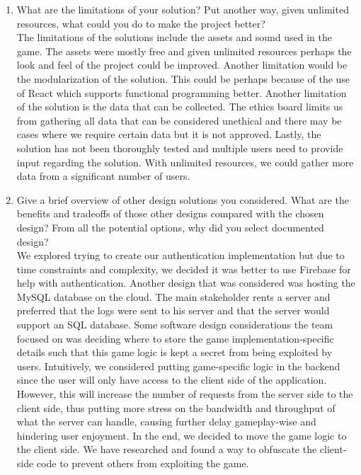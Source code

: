\documentclass[12pt, titlepage]{article}
\begin{document}
\begin{enumerate}
  \item What are the limitations of your solution?  Put another way, given
  unlimited resources, what could you do to make the project better? \\
  
  \smallskip
  The limitations of the solutions include the assets and sound used in the game. The assets were mostly free and given unlimited resources perhaps the look and feel of the project could be improved. Another limitation would be the modularization of the solution. This could be perhaps because of the use of React which supports functional programming better. Another limitation of the solution is the data that can be collected. The ethics board limits us from gathering all data that can be considered unethical and there may be cases where we require certain data but it is not approved. Lastly, the solution has not been thoroughly tested and multiple users need to provide input regarding the solution. With unlimited resources, we could gather more data from a significant number of users.
  \item Give a brief overview of other design solutions you considered.  What
  are the benefits and tradeoffs of those other designs compared with the chosen
  design?  From all the potential options, why did you select documented design?\\
  
  \medskip
  We explored trying to create our authentication implementation but due to time constraints and complexity, we decided it was better to use Firebase for help with authentication. Another design that was considered was hosting the MySQL database on the cloud. The main stakeholder rents a server and preferred that the logs were sent to his server and that the server would support an SQL database. Some software design considerations the team focused on was deciding where to store the game implementation-specific details such that this game logic is kept a secret from being exploited by users. Intuitively, we considered putting game-specific logic in the backend since the user will only have access to the client side of the application. However, this will increase the number of requests from the server side to the client side, thus putting more stress on the bandwidth and throughput of what the server can handle, causing further delay gameplay-wise and hindering user enjoyment. In the end, we decided to move the game logic to the client side. We have researched and found a way to obfuscate the client-side code to prevent others from exploiting the game. 
\\
  
\end{enumerate}
\end{document}
